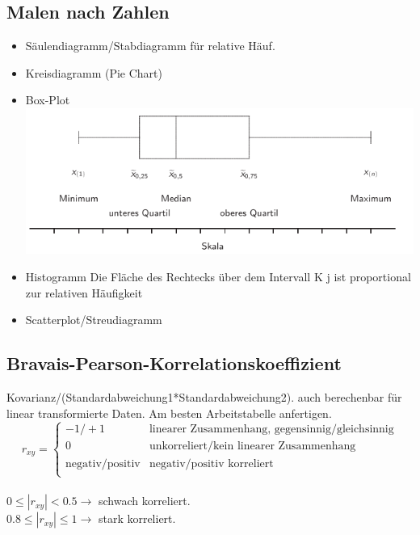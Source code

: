 \documentclass[10pt,a4paper]{article}
\begin{document}
	\subsection{Malen nach Zahlen}
	\begin{itemize}
		\item Säulendiagramm/Stabdiagramm für relative Häuf.
		\item Kreisdiagramm (Pie Chart)
		\item Box-Plot\\ \includegraphics[scale=0.3]{boxplot.png}
		\item Histogramm Die Fläche des Rechtecks über dem Intervall K j ist proportional zur relativen Häufigkeit
		\item Scatterplot/Streudiagramm
	\end{itemize}
	 \subsection{Bravais-Pearson-Korrelationskoeffizient}
	 Kovarianz/(Standardabweichung1*Standardabweichung2). auch berechenbar für linear transformierte Daten. Am besten Arbeitstabelle anfertigen.\\
	 \begin{equation}
	 r_{xy} =
	 \begin{cases}
	 -1/+1 & \text {linearer Zusammenhang, gegensinnig/gleichsinnig} \\
	 0 & \text{unkorreliert/kein linearer Zusammenhang} \\
	 \text{negativ/positiv} & \text{negativ/positiv korreliert}  \\
	 \end{cases}
	 \end{equation}\\
	 $0 \leq |r_{xy}| < 0.5 \rightarrow $ schwach korreliert.\\
	 $0.8 \leq |r_{xy}| \leq 1 \rightarrow $ stark korreliert.\\
	 
\end{document}
